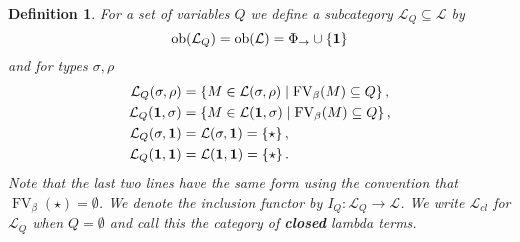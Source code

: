 \documentclass[english,letter paper,12pt,leqno]{article}
\def\typearrow{\Rightarrow}
\def\FV{\operatorname{FV}}
\theoremstyle{example}
\newtheorem{definition}[theorem]{Definition}
\newtheorem{remark}[theorem]{Remark}
\numberwithin{equation}{section}
\newcommand{\call}[1]{\mathcal{#1}}
\def\FV{\operatorname{FV}}
\def\typearrow{\rightarrow}
\begin{document}


\begin{definition}\label{definition:lambda_Q} For a set of variables $Q$ we define a subcategory $\call{L}_Q \subseteq \call{L}$ by
	\[
	\operatorname{ob}(\call{L}_Q) = \operatorname{ob}(\call{L}) = \Phi_{\typearrow} \cup \{ \bold{1} \}
	\]
	and for types $\sigma, \rho$
	\begin{align*}
		\call{L}_Q(\sigma, \rho) &= \{ M \in \call{L}(\sigma, \rho) \mid \FV_\beta(M) \subseteq Q \}\,,\\
		\call{L}_Q(\bold{1}, \sigma) &= \{ M \in \call{L}(\bold{1}, \sigma) \mid \FV_\beta(M) \subseteq Q \}\,,\\
		\call{L}_Q(\sigma, \bold{1} ) &= \call{L}(\sigma, \bold{1}) = \{ \star \}\,,\\
		\call{L}_Q(\bold{1}, \bold{1}) &= \call{L}(\bold{1}, \bold{1}) = \{ \star \}\,.
	\end{align*}
	Note that the last two lines have the same form using the convention that $\FV_\beta(\star) = \emptyset$. We denote the inclusion functor by $I_Q: \call{L}_Q \longrightarrow \call{L}$. We write $\call{L}_{cl}$ for $\call{L}_Q$ when $Q = \emptyset$ and call this the category of \textbf{closed} lambda terms.
\end{definition}
\end{document}
